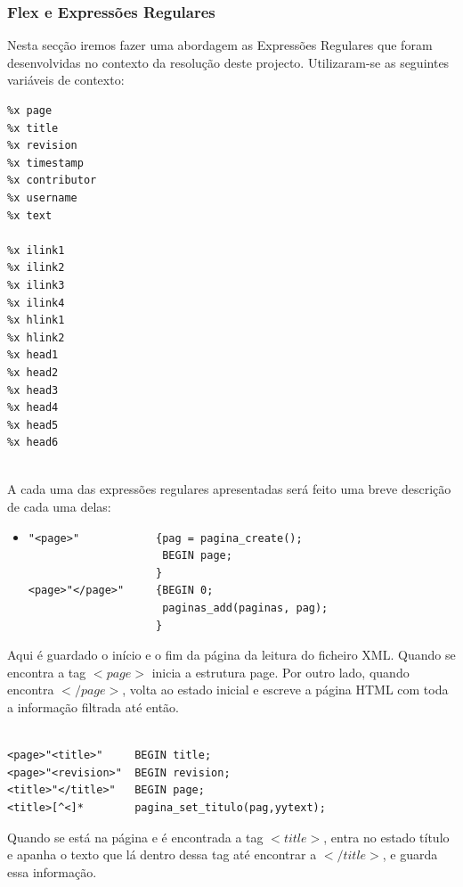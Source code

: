 \documentclass[11pt, a4paper, oneside]{article}
\begin{document}
\subsubsection{Flex e Expressões Regulares}

Nesta secção iremos fazer uma abordagem as Expressões Regulares que foram desenvolvidas no contexto da resolução deste projecto. Utilizaram-se as seguintes variáveis de contexto:

\begin{verbatim}
%x page
%x title
%x revision
%x timestamp
%x contributor
%x username
%x text

%x ilink1
%x ilink2
%x ilink3
%x ilink4
%x hlink1
%x hlink2
%x head1
%x head2
%x head3
%x head4
%x head5
%x head6


\end{verbatim}

A cada uma das expressões regulares apresentadas será feito uma breve descrição de cada uma delas:
\begin{itemize}
\item 
\begin{verbatim}
"<page>"            {pag = pagina_create();
                     BEGIN page;
                    }
<page>"</page>"     {BEGIN 0;
                     paginas_add(paginas, pag);
                    }
\end{verbatim}
\end{itemize}
Aqui é guardado o início e o fim da página da leitura do ficheiro XML. Quando se encontra a tag \begin{math}<page>\end{math} inicia a estrutura page. Por outro lado, quando encontra \begin{math}</page>\end{math}, volta ao estado inicial e escreve a página HTML com toda a informação filtrada até então.


\begin{verbatim}

<page>"<title>"     BEGIN title;
<page>"<revision>"  BEGIN revision;
<title>"</title>"   BEGIN page;
<title>[^<]*        pagina_set_titulo(pag,yytext);

\end{verbatim}


Quando se está na página e é encontrada a tag \begin{math}<title>\end{math}, entra no estado título e apanha o texto que lá dentro dessa tag até encontrar a \begin{math}</title>\end{math}, e guarda essa informação.
\end{document}
